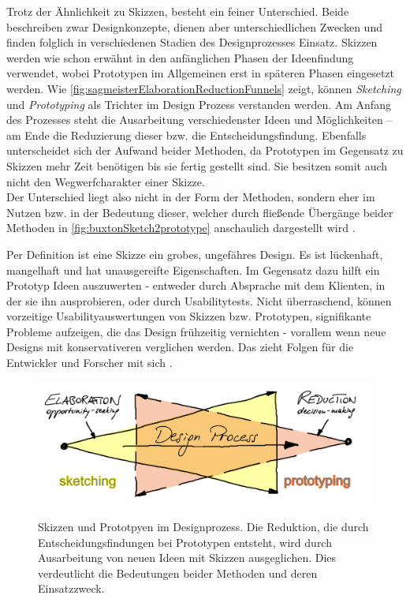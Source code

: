 \medskip Trotz der Ähnlichkeit zu Skizzen, besteht ein feiner Unterschied. Beide beschreiben zwar Designkonzepte, dienen aber unterschiedlichen Zwecken und finden folglich in verschiedenen Stadien des Designprozesses Einsatz. Skizzen werden wie schon erwähnt in den anfänglichen Phasen	der	Ideenfindung verwendet, wobei Prototypen im	Allgemeinen	erst in späteren Phasen eingesetzt werden. Wie \autoref{fig:sagmeisterElaborationReductionFunnels} zeigt, können \emph{Sketching} und \emph{Prototyping} als Trichter im Design Prozess verstanden werden. Am Anfang des Prozesses steht die Ausarbeitung verschiedenster Ideen und Möglichkeiten – am Ende die Reduzierung dieser bzw. die Entscheidungsfindung.
Ebenfalls unterscheidet sich der Aufwand beider Methoden, da Prototypen im Gegensatz zu Skizzen mehr Zeit benötigen bis sie fertig gestellt sind. Sie besitzen somit auch nicht den Wegwerfcharakter einer Skizze. \\
Der Unterschied liegt also nicht in	der	Form der Methoden, sondern eher im Nutzen bzw. in der Bedeutung dieser,	welcher	durch fließende Übergänge beider Methoden in \autoref{fig:buxtonSketch2prototype} anschaulich dargestellt wird \citep{Sagmeister:2008}.

\medskip Per Definition ist eine Skizze ein grobes, ungefähres Design. Es ist lückenhaft, mangelhaft und hat unausgereifte Eigenschaften. Im Gegensatz dazu hilft ein Prototyp Ideen auszuwerten - entweder durch Absprache mit dem Klienten, in der sie ihn ausprobieren, oder durch Usabilitytests. Nicht überraschend, können vorzeitige Usabilityauswertungen von Skizzen bzw. Prototypen, signifikante Probleme aufzeigen, die das Design frühzeitig vernichten - vorallem wenn neue Designs mit konservativeren verglichen werden. Das zieht Folgen für die Entwickler und Forscher mit sich \citep{Greenberg:2008}.
	
\begin{figure}
	\begin{center}
        {\includegraphics[width=\linewidth]{gfx/sagmeisterElaborationReductionFunnels}}
	\end{center}
		\caption[Skizzen und Prototpyen im Designprozess. \newline \citep{Sagmeister:2008}]{Skizzen und Prototpyen im Designprozess. Die Reduktion, die durch Entscheidungsfindungen bei Prototypen entsteht, wird durch Ausarbeitung von neuen Ideen mit Skizzen ausgeglichen. Dies verdeutlicht die Bedeutungen beider Methoden und deren Einsatzzweck.}\label{fig:sagmeisterElaborationReductionFunnels}
\end{figure}

